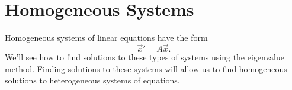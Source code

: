 \section{Homogeneous Systems}
\noindent
Homogeneous systems of linear equations have the form
\begin{equation*}
	\vec{x}' = A\vec{x}.
\end{equation*}
We'll see how to find solutions to these types of systems using the eigenvalue method.
Finding solutions to these systems will allow us to find homogeneous solutions to heterogeneous systems of equations.

